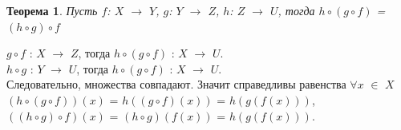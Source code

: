 \newtheorem*{t6_2_3}{Теорема}\begin{t6_2_3} Пусть $f$: $X$ $\rightarrow$ $Y$, $g$: $Y$ $\rightarrow$ $Z$, $h$: $Z$ $\rightarrow$ $U$, тогда $h \circ (g \circ f)$ = $(h \circ g) \circ f$
\end{t6_2_3} \begin{Proof} 
	$g \circ f$ : $X$ $\rightarrow$ $Z$, тогда $h \circ (g \circ f)$ : $X$ $\rightarrow$ $U$. \\
	$h \circ g$ : $Y$ $\rightarrow$ $U$, тогда $h \circ (g \circ f)$ : $X$ $\rightarrow$ $U$. \\
	Следовательно, множества совпадают. Значит справедливы равенства
	$\forall x$ $\in$ $X$ \\ $(h \circ (g \circ f))(x)$ = $h((g \circ f)(x))$ = $h(g(f(x)))$, \\
	$((h \circ g) \circ f)(x)$ = $(h \circ g)(f(x))$ = $h(g(f(x)))$.
\end{Proof}





